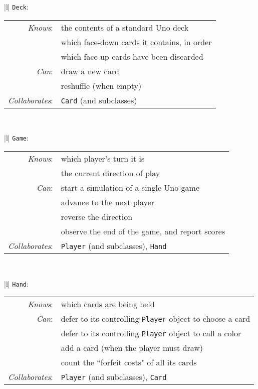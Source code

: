 \begin{center}
\begin{tabular}{|l|}
\hline
\texttt{Deck}:\\
\hline
\begin{tabular}{rl}
\textit{Knows}: & the contents of a standard Uno deck \\
& which face-down cards it contains, in order \\
& which face-up cards have been discarded \\
\textit{Can}: & draw a new card \\
& reshuffle (when empty) \\
\hline
\textit{Collaborates}: & \texttt{Card} (and subclasses)\\
\end{tabular}\\
\hline
\end{tabular}
\end{center}

\begin{center}
\begin{tabular}{|l|}
\hline
\texttt{Game}:\\
\hline
\begin{tabular}{rl}
\textit{Knows}: & which player's turn it is \\
& the current direction of play \\
\textit{Can}: & start a simulation of a single Uno game \\
& advance to the next player \\
& reverse the direction \\
& observe the end of the game, and report scores \\
\hline
\textit{Collaborates}: & \texttt{Player} (and subclasses), \texttt{Hand} \\
\end{tabular}\\
\hline
\end{tabular}
\end{center}

\begin{center}
\begin{tabular}{|l|}
\hline
\texttt{Hand}:\\
\hline
\begin{tabular}{rl}
\textit{Knows}: & which cards are being held \\
\textit{Can}: & defer to its controlling \texttt{Player} object to choose a card \\
& defer to its controlling \texttt{Player} object to call a color \\
& add a card (when the player must draw) \\
& count the ``forfeit costs" of all its cards \\
\hline
\textit{Collaborates}: & \texttt{Player} (and subclasses), \texttt{Card}\\
\end{tabular}\\
\hline
\end{tabular}
\end{center}

